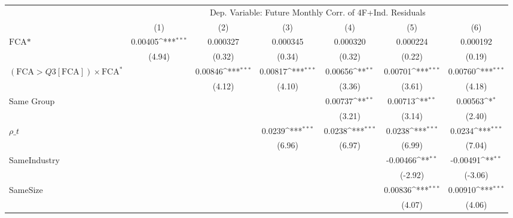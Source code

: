 {
\def\sym#1{\ifmmode^{#1}\else\(^{#1}\)\fi}
\begin{tabular}{l*{6}{c}}
\hline\hline
                &\multicolumn{6}{c}{Dep. Variable: Future Monthly Corr. of 4F+Ind. Residuals}                                     \\\cmidrule(lr){2-7}
                &\multicolumn{1}{c}{(1)}         &\multicolumn{1}{c}{(2)}         &\multicolumn{1}{c}{(3)}         &\multicolumn{1}{c}{(4)}         &\multicolumn{1}{c}{(5)}         &\multicolumn{1}{c}{(6)}         \\
\hline
$ \text{FCA*} $ &  0.00405\sym{***}& 0.000327         & 0.000345         & 0.000320         & 0.000224         & 0.000192         \\
                &   (4.94)         &   (0.32)         &   (0.34)         &   (0.32)         &   (0.22)         &   (0.19)         \\
[1em]
 $ (\text{FCA} > Q3[\text{FCA}]) \times {\text{FCA} ^*}  $ &                  &  0.00846\sym{***}&  0.00817\sym{***}&  0.00656\sym{**} &  0.00701\sym{***}&  0.00760\sym{***}\\
                &                  &   (4.12)         &   (4.10)         &   (3.36)         &   (3.61)         &   (4.18)         \\
[1em]
Same Group      &                  &                  &                  &  0.00737\sym{**} &  0.00713\sym{**} &  0.00563\sym{*}  \\
                &                  &                  &                  &   (3.21)         &   (3.14)         &   (2.40)         \\
[1em]
 $ {\rho\_t} $   &                  &                  &   0.0239\sym{***}&   0.0238\sym{***}&   0.0238\sym{***}&   0.0234\sym{***}\\
                &                  &                  &   (6.96)         &   (6.97)         &   (6.99)         &   (7.04)         \\
[1em]
SameIndustry    &                  &                  &                  &                  & -0.00466\sym{**} & -0.00491\sym{**} \\
                &                  &                  &                  &                  &  (-2.92)         &  (-3.06)         \\
[1em]
SameSize        &                  &                  &                  &                  &  0.00836\sym{***}&  0.00910\sym{***}\\
                &                  &                  &                  &                  &   (4.07)         &   (4.06)         \\

\end{tabular}}
